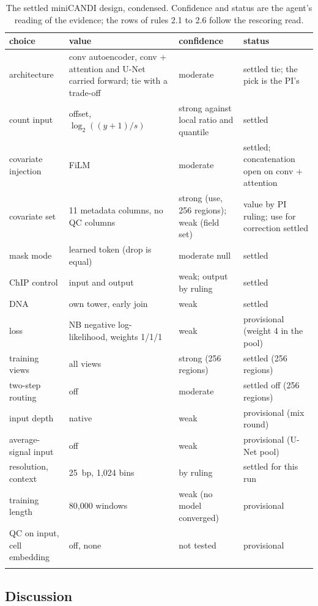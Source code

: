 \documentclass[pdflatex,sn-mathphys-num]{sn-jnl}
\newcommand{\lit}[1]{#1}
\newcommand{\cl}[1]{#1}
\newcommand{\dsAvgConf}{weak}
\newcommand{\dsAvgStatus}{provisional (U-Net pool)}
\newcommand{\dsCovConf}{strong (use, 256 regions); weak (field set)}
\newcommand{\dsCovStatus}{value by PI ruling; use for correction settled}
\newcommand{\dsDepthConf}{weak}
\newcommand{\dsDepthStatus}{provisional (mix round)}
\newcommand{\dsLossConf}{weak}
\newcommand{\dsLossStatus}{provisional (weight 4 in the pool)}
\newcommand{\dsTwostepConf}{moderate}
\newcommand{\dsTwostepStatus}{settled off (256 regions)}
\newcommand{\dsViewsConf}{strong (256 regions)}
\newcommand{\dsViewsStatus}{settled (256 regions)}
\begin{document}
\begin{table}[!htbp]
\caption{\cl{The settled miniCANDI design, condensed. Confidence and status are the agent's reading of the evidence; the rows of rules \lit{2.1} to \lit{2.6} follow the rescoring read.}}\label{tab:design}
\scriptsize
\begin{tabular}{p{2.8cm}p{4.3cm}p{2.0cm}p{2.9cm}}
\toprule
choice & value & confidence & status \\
\midrule
architecture & conv autoencoder, conv + attention and U-Net carried forward; tie with a trade-off & moderate & settled tie; the pick is the PI's \\
count input & offset, $\log_{\lit{2}}((y+\lit{1})/s)$ & strong against local ratio and quantile & settled \\
covariate injection & FiLM & moderate & settled; concatenation open on conv + attention \\
covariate set & \lit{11} metadata columns, no QC columns & \dsCovConf{} & \dsCovStatus{} \\
mask mode & learned token (drop is equal) & moderate null & settled \\
ChIP control & input and output & weak; output by ruling & settled \\
DNA & own tower, early join & weak & settled \\
loss & NB negative log-likelihood, weights \lit{1}/\lit{1}/\lit{1} & \dsLossConf{} & \dsLossStatus{} \\
training views & all views & \dsViewsConf{} & \dsViewsStatus{} \\
two-step routing & off & \dsTwostepConf{} & \dsTwostepStatus{} \\
input depth & native & \dsDepthConf{} & \dsDepthStatus{} \\
average-signal input & off & \dsAvgConf{} & \dsAvgStatus{} \\
resolution, context & \lit{25}~bp, \lit{1,024} bins & by ruling & settled for this run \\
training length & \lit{80,000} windows & weak (no model converged) & provisional \\
QC on input, cell embedding & off, none & not tested & provisional \\
\botrule
\end{tabular}
\end{table}

\subsection{Discussion}
\end{document}
